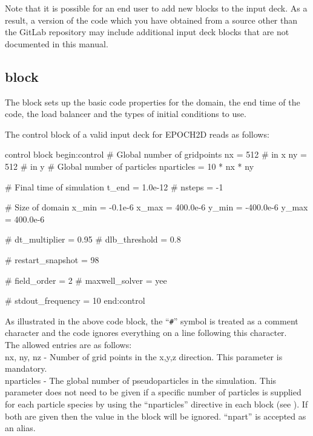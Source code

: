 Note that it is possible for an end user to add new blocks to the input deck.
As a result, a version of the code which you have obtained from a source other
than the GitLab repository may include additional input deck blocks that are
not documented in this manual.

\subsection{\texorpdfstring
  { block}
  {           {control} block}}
\label{sec:control_block}
The  block sets up the basic code properties for the
domain, the end time of the code, the load balancer and the types of initial
conditions to use.

The control block of a valid input deck for EPOCH2D reads as follows:
\begin{lboxverbatim}{control block}
begin:control
   # Global number of gridpoints
   nx = 512 # in x
   ny = 512 # in y
   # Global number of particles
   nparticles = 10 * nx * ny

   # Final time of simulation
   t_end = 1.0e-12
   # nsteps = -1

   # Size of domain
   x_min = -0.1e-6
   x_max = 400.0e-6
   y_min = -400.0e-6
   y_max = 400.0e-6

   # dt_multiplier = 0.95
   # dlb_threshold = 0.8

   # restart_snapshot = 98

   # field_order = 2
   # maxwell_solver = yee

   # stdout_frequency = 10
end:control
\end{lboxverbatim}

As illustrated in the above code block, the ``{\texttt{\#}}'' symbol is treated
as a comment character and the code ignores everything on a line following this
character.\\

The allowed entries are as follows:\\

{\emphtext nx, ny, nz} - Number of grid points in the x,y,z direction. This
parameter is mandatory.\\

{\emphtext nparticles} - The global number of pseudoparticles in the
simulation. This parameter does not need to be given if a specific number
of particles is supplied for each particle species by using the ``nparticles''
directive in each  block (see ). If both are
given then the value in the  block will be ignored.
``npart'' is accepted as an alias.\\

